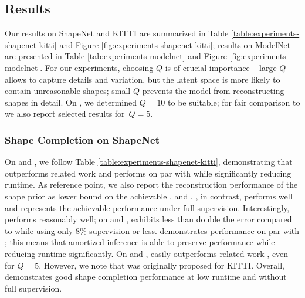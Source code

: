 \subsection{Results}



Our results on ShapeNet and KITTI are summarized in Table \ref{table:experiments-shapenet-kitti} and Figure \ref{fig:experiments-shapenet-kitti}; results on ModelNet are presented in Table \ref{tab:experiments-modelnet} and Figure \ref{fig:experiments-modelnet}. For our experiments, choosing $Q$ is of crucial importance -- large $Q$ allows to capture details and variation, but the latent space is more likely to contain unreasonable shapes; small $Q$ prevents the model from reconstructing shapes in detail. On \clean, we determined $Q = 10$ to be suitable; for fair comparison to \cite{Engelmann2016GCPR} we also report selected results for~$Q = 5$. 

\vspace*{-6px}
\subsubsection{Shape Completion on ShapeNet}

On \clean and \noisy, we follow Table \ref{table:experiments-shapenet-kitti}, demonstrating that \AML outperforms related work \cite{Engelmann2016GCPR} and performs on par with \ML while significantly reducing runtime. As reference point, we also report the reconstruction performance of the \VAE shape prior as lower bound on the achievable \Abs, \Acc and \Compl.
\Sup, in contrast, performs well and represents the achievable performance under full supervision. Interestingly, \ML performs reasonably well; on \clean and \noisy, \ML exhibits less than double the error compared to \Sup while using only 8\% supervision or less. \AML demonstrates performance on par with \ML; this means that amortized inference is able to preserve performance while reducing runtime significantly. On \clean and \noisy, \AML easily outperforms related work \cite{Engelmann2016GCPR}, even for $Q = 5$. However, we note that \cite{Engelmann2016GCPR} was originally proposed for KITTI. Overall, \AML demonstrates good shape completion performance at low runtime and without full supervision.

